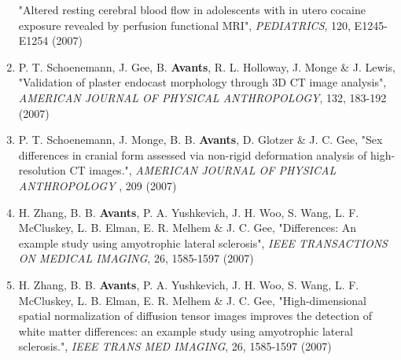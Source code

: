 \documentclass[11pt]{moderncv} %
\begin{document}
\begin{enumerate}
"Altered resting cerebral blood flow in adolescents with in utero cocaine exposure revealed by perfusion functional MRI", 
{\em PEDIATRICS}, 120, E1245-E1254 (2007)
\item P. T. Schoenemann, J. Gee, B. \textbf{Avants}, R. L. Holloway, J. Monge \&  J. Lewis, 
"Validation of plaster endocast morphology through 3D CT image analysis", 
{\em AMERICAN JOURNAL OF PHYSICAL ANTHROPOLOGY}, 132, 183-192 (2007)
\item P. T. Schoenemann, J. Monge, B. B. \textbf{Avants}, D. Glotzer \&  J. C. Gee, 
"Sex differences in cranial form assessed via non-rigid deformation analysis of high-resolution CT images.", 
{\em AMERICAN JOURNAL OF PHYSICAL ANTHROPOLOGY}
,
209 (2007)
\item H. Zhang, B. B. \textbf{Avants}, P. A. Yushkevich, J. H. Woo, S. Wang, L. F. McCluskey, L. B. Elman, E. R. Melhem \&  J. C. Gee, 
"Differences: An example study using amyotrophic lateral sclerosis", 
{\em IEEE TRANSACTIONS ON MEDICAL IMAGING}, 26, 1585-1597 (2007)
\item H. Zhang, B. B. \textbf{Avants}, P. A. Yushkevich, J. H. Woo, S. Wang, L. F. McCluskey, L. B. Elman, E. R. Melhem \&  J. C. Gee, 
"High-dimensional spatial normalization of diffusion tensor images improves the detection of white matter differences: an example study using amyotrophic lateral sclerosis.", 
{\em IEEE TRANS MED IMAGING}, 26, 1585-1597 (2007)


\end{enumerate}
\end{document}
